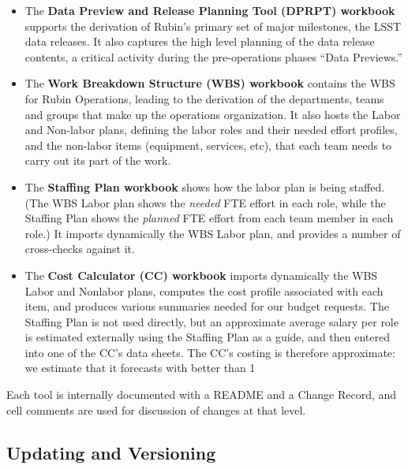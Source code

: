 \begin{itemize}

\item The \textbf{Data Preview and Release Planning Tool (DPRPT) workbook} supports the derivation of Rubin's primary set of major milestones, the LSST data releases.
It also captures the high level planning of the data release contents, a critical activity during the pre-operations phases ``Data Previews.''

\item The \textbf{Work Breakdown Structure (WBS) workbook} contains the WBS for Rubin Operations, leading to the derivation of the departments, teams and groups that make up the operations organization.
It also hosts the Labor and Non-labor plans, defining the labor roles and their needed effort profiles, and the non-labor items (equipment, services, etc), that each team needs to carry out its part of the work.

\item The \textbf{Staffing Plan workbook} shows how the labor plan is being staffed.
(The WBS Labor plan shows the \textit{needed} FTE effort in each role, while the Staffing Plan shows the \textit{planned} FTE effort from each team member in each role.)
It imports dynamically the WBS Labor plan, and provides a number of cross-checks against it.

\item The \textbf{Cost Calculator (CC) workbook} imports dynamically the WBS Labor and Nonlabor plans, computes the cost profile associated with each item, and produces various summaries needed for our budget requests.
The Staffing Plan is not used directly, but an approximate average salary per role is estimated externally using the Staffing Plan as a guide, and then entered into one of the CC's data sheets.
The CC's costing is therefore approximate: we estimate that it forecasts with better than 1%

\end{itemize}

Each tool is internally documented with a README and a Change Record, and cell comments are used for discussion of changes at that level.

\subsection{Updating and Versioning}

